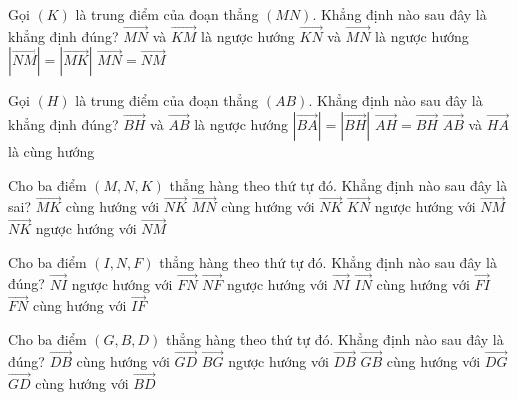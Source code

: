 \begin{ex}
Gọi $(K)$ là trung điểm của đoạn thẳng $(MN)$. Khẳng định nào sau đây là khẳng định đúng?
\choice
{\True $\overrightarrow{MN}$ và $\overrightarrow{KM}$ là ngược hướng}
{$\overrightarrow{KN}$ và $\overrightarrow{MN}$ là ngược hướng}
{$|\overrightarrow{NM}|=|\overrightarrow{MK}|$}
{$\overrightarrow{MN}=\overrightarrow{NM}$}
\end{ex}

\begin{ex}
Gọi $(H)$ là trung điểm của đoạn thẳng $(AB)$. Khẳng định nào sau đây là khẳng định đúng?
\choice
{\True $\overrightarrow{BH}$ và $\overrightarrow{AB}$ là ngược hướng}
{$|\overrightarrow{BA}|=|\overrightarrow{BH}|$}
{$\overrightarrow{AH}=\overrightarrow{BH}$}
{$\overrightarrow{AB}$ và $\overrightarrow{HA}$ là cùng hướng}
\end{ex}

\begin{ex}
Cho ba điểm $(M,N,K)$ thẳng hàng theo thứ tự đó. Khẳng định nào sau đây là sai?
\choice
{$\overrightarrow{MK}$ cùng hướng với $\overrightarrow{NK}$}
{$\overrightarrow{MN}$ cùng hướng với $\overrightarrow{NK}$}
{\True $\overrightarrow{KN}$ ngược hướng với $\overrightarrow{NM}$}
{$\overrightarrow{NK}$ ngược hướng với $\overrightarrow{NM}$}
\end{ex}

\begin{ex}
Cho ba điểm $(I,N,F)$ thẳng hàng theo thứ tự đó. Khẳng định nào sau đây là đúng?
\choice
{$\overrightarrow{NI}$ ngược hướng với $\overrightarrow{FN}$}
{\True $\overrightarrow{NF}$ ngược hướng với $\overrightarrow{NI}$}
{$\overrightarrow{IN}$ cùng hướng với $\overrightarrow{FI}$}
{$\overrightarrow{FN}$ cùng hướng với $\overrightarrow{IF}$}
\end{ex}

\begin{ex}
Cho ba điểm $(G,B,D)$ thẳng hàng theo thứ tự đó. Khẳng định nào sau đây là đúng?
\choice
{$\overrightarrow{DB}$ cùng hướng với $\overrightarrow{GD}$}
{$\overrightarrow{BG}$ ngược hướng với $\overrightarrow{DB}$}
{$\overrightarrow{GB}$ cùng hướng với $\overrightarrow{DG}$}
{\True $\overrightarrow{GD}$ cùng hướng với $\overrightarrow{BD}$}
\end{ex}

